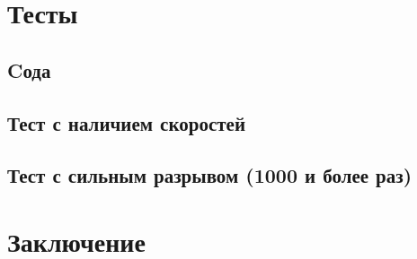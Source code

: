 \documentclass[a4paper,12pt]{extarticle}
\begin{document}
\section{Тесты}
\subsection{Cода}
\subsection{Тест с наличием скоростей}
\subsection{Тест с сильным разрывом (1000 и более раз)}

\section{Заключение}

\clearpage
\printbibliography
\end{document}
